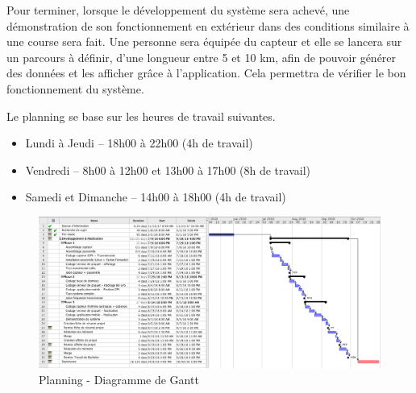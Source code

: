 Pour terminer, lorsque le développement du système sera achevé, une démonstration de son fonctionnement en extérieur dans des conditions similaire à une course sera fait. Une personne sera équipée du capteur et elle se lancera sur un parcours à définir, d’une longueur entre 5 et 10 km, afin de pouvoir générer des données et les afficher grâce à l’application. Cela permettra de vérifier le bon fonctionnement du système.

Le planning se base sur les heures de travail suivantes.

\begin{itemize}
\item Lundi à Jeudi – 18h00 à 22h00 (4h de travail)
\item Vendredi – 8h00 à 12h00 et 13h00 à 17h00 (8h de travail)
\item Samedi et Dimanche – 14h00 à 18h00 (4h de travail)
\end{itemize}


\begin{landscape}
\begin{figure}[h]
\centering
\includegraphics[width=\linewidth,height=\textheight,keepaspectratio]{../../planning/gantt_planning.png}
\caption[Planning - Diagramme de Gantt]{Planning - Diagramme de Gantt}
\label{fig:planning}
\end{figure}
\end{landscape}


